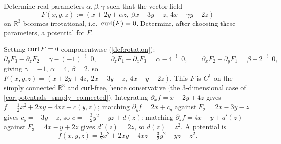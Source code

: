 
\begin{exercise}
\label{ex:choose_parameters_irrotational}
Determine real parameters $\alpha,\beta,\gamma$ such that the vector field
\[F(x,y,z) := (x+2y+\alpha z,\ \beta x-3y-z,\ 4x+\gamma y+2z)\]
on $\mathbb{R}^3$ becomes irrotational, i.e.\ $\operatorname{curl}(F)=0$. Determine, after choosing these
parameters, a potential for $F$.
\end{exercise}

\begin{exercisesolution}
Setting $\operatorname{curl} F = 0$ componentwise (\cref{def:rotation}):
\[\partial_yF_3-\partial_zF_2 = \gamma-(-1) \overset{!}{=} 0, \qquad
  \partial_zF_1-\partial_xF_3 = \alpha-4 \overset{!}{=} 0, \qquad
  \partial_xF_2-\partial_yF_1 = \beta-2 \overset{!}{=} 0,\]
giving $\gamma=-1$, $\alpha=4$, $\beta=2$, so
$F(x,y,z) = (x+2y+4z,\ 2x-3y-z,\ 4x-y+2z)$. This $F$ is $C^1$ on the simply connected
$\mathbb{R}^3$ and curl-free, hence conservative (the $3$-dimensional case of
\cref{cor:potentials_simply_connected}). Integrating $\partial_xf = x+2y+4z$ gives
$f = \tfrac12x^2+2xy+4xz+c(y,z)$; matching $\partial_yf = 2x+c_y$ against $F_2=2x-3y-z$ gives
$c_y=-3y-z$, so $c = -\tfrac32y^2-yz+d(z)$; matching
$\partial_zf = 4x-y+d'(z)$ against $F_3=4x-y+2z$ gives $d'(z)=2z$, so $d(z)=z^2$. A potential is
\[f(x,y,z) = \tfrac12x^2+2xy+4xz-\tfrac32y^2-yz+z^2.\]
\end{exercisesolution}

